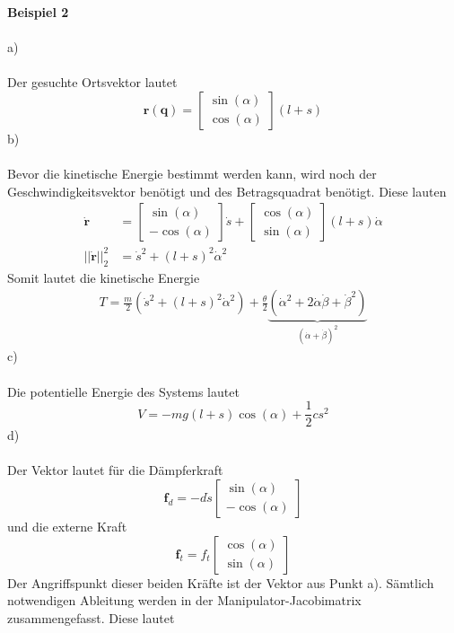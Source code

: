 \newpage
\noindent
\textbf{Beispiel 2}\\ \\
a)\\ \\
Der gesuchte Ortsvektor lautet
\[
	\textbf{r}(\textbf{q}) = \begin{bmatrix}
		\sin(\alpha) \\
		\cos(\alpha)
	\end{bmatrix}
	(l + s)
\]
b)\\ \\
Bevor die kinetische Energie bestimmt werden kann, wird noch der Geschwindigkeitsvektor benötigt und des Betragsquadrat benötigt. Diese lauten
\begin{align*}
	\dot{\textbf{r}} &= \begin{bmatrix}
		\sin(\alpha) \\
		-\cos(\alpha)
	\end{bmatrix}
	\dot{s} + \begin{bmatrix}
		\cos(\alpha) \\
		\sin(\alpha)
	\end{bmatrix}
	(l + s)\dot{\alpha}
	\\
	||\dot{\textbf{r}}||^2_2 &= \dot{s}^2 + (l + s)^2\dot{\alpha}^2
\end{align*}
Somit lautet die kinetische Energie
\begin{align*}
	T = \frac{m}{2}\left(\dot{s}^2 + (l + s)^2\dot{\alpha}^2\right) + \frac{\theta}{2}\underbrace{\left(\dot{\alpha}^2 + 2\dot{\alpha}\dot{\beta} + \dot{\beta}^2\right)}_{(\dot{\alpha} + \dot{\beta})^2}
\end{align*}
c)\\ \\
Die potentielle Energie des Systems lautet 
\[
	V = -mg(l + s)\cos(\alpha) + \frac{1}{2}cs^2
\]
d)\\ \\
Der Vektor lautet für die Dämpferkraft
\[
	\textbf{f}_d = -d\dot{s}\begin{bmatrix}
		\sin(\alpha) \\
		-\cos(\alpha)
	\end{bmatrix}
\]
und die externe Kraft
\[
	\textbf{f}_t = f_t\begin{bmatrix}
		\cos(\alpha) \\
		\sin(\alpha)
	\end{bmatrix}
\]
Der Angriffspunkt dieser beiden Kräfte ist der Vektor aus Punkt a). Sämtlich notwendigen Ableitung werden in der Manipulator-Jacobimatrix zusammengefasst. Diese lautet

